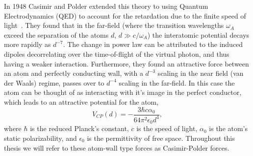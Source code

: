 In 1948 Casimir and Polder extended this theory to using Quantum Electrodynamics
(QED) to account for the retardation due to the finite speed of light~\cite{CasimirPolder1948}. 
They found that in the far-field 
(where the transition wavelengths $\omega_A$ exceed the separation of the atoms $d$, $d\gg c/\omega_A$)
the interatomic potential decays more rapidly as $d^{-7}$.  The change in power law can be 
attributed to the induced dipoles decorrelating over the time-of-flight of the virtual photon, 
and thus having a weaker interaction.  
Furthermore, they found an attractive force between an atom and perfectly conducting wall, with a $d^{-3}$ scaling
in the near field (van der Waals) regime, passes over to $d^{-4}$ scaling in the far-field.
In this case the atom can be thought of as interacting with it's image in the perfect conductor,   
which leads to an attractive potential for the atom,
\begin{equation}
  V_{CP}(d) =-\frac{3\hbar c\alpha_0}{64\pi^2\epsilon_0 d^4},
\end{equation}
where $\hbar$ is the reduced Planck's constant, $c$ is the speed of light, $\alpha_0$ is the atom's static polarizability,
and $\epsilon_0$ is the permittivity of free space.  Throughout this thesis we will refer to these
atom-wall type forces as Casimir-Polder forces.  

